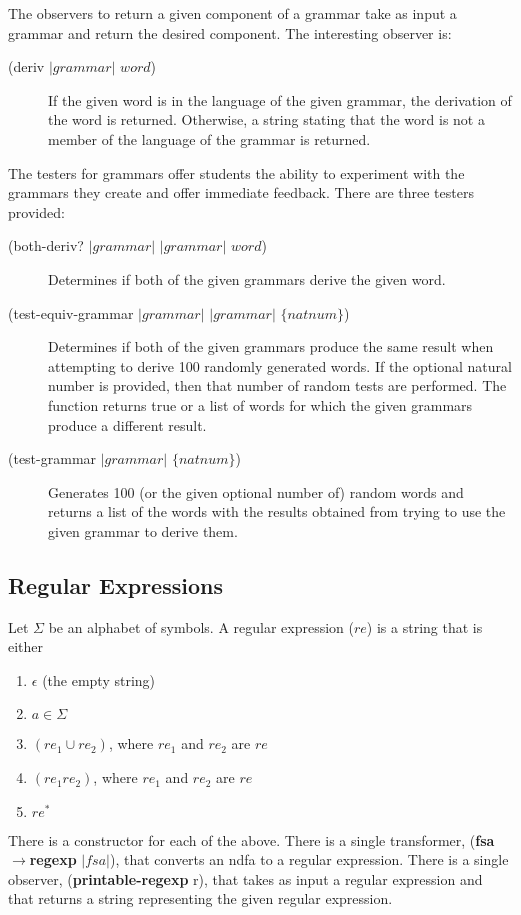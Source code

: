\documentclass{eptcs}
\begin{document}
The observers to return a given component of a grammar take as input a grammar and return the desired component. The interesting observer is:
\begin{description}
  \item [(deriv $|grammar|$ $word$)] If the given word is in the language of the given grammar, the derivation of the word is returned. Otherwise, a string stating that the word is not a member of the language of the grammar is returned.
\end{description}

The testers for grammars offer students the ability to experiment with the grammars they create and offer immediate feedback. There are three testers provided:
\begin{description}
  \item [(both-deriv? $|grammar|$ $|grammar|$ $word$)] Determines if both of the given grammars derive the given word.

  \item [(test-equiv-grammar $|grammar|$ $|grammar|$ $\{natnum\}$)] Determines if both of the given grammars produce the same result when attempting to derive 100 randomly generated words. If the optional natural number is provided, then that number of random tests are performed. The function returns true or a list of words for which the given grammars produce a different result.

  \item [(test-grammar $|grammar|$ $\{natnum\}$)] Generates 100 (or the given optional number of) random words and returns a list of the words with the results obtained from trying to use the given grammar to derive them.
\end{description}

\subsection{Regular Expressions}
Let $\Sigma$ be an alphabet of symbols. A regular expression ($re$) is a string  that is either
\begin{enumerate}
  \item $\epsilon$ (the empty string)
  \item $a \in \Sigma$
  \item $(re_1 \cup re_2)$, where $re_1$ and $re_2$ are $re$
  \item $(re_1re_2)$, where $re_1$ and $re_2$ are $re$
  \item $re^*$
\end{enumerate}
There is a constructor for each of the above. There is a single transformer, (\textbf{fsa$\rightarrow$regexp} $|fsa|$), that converts an \textsf{ndfa} to a regular expression. There is a single observer, (\textbf{printable-regexp} r), that takes as input a regular expression and that returns a string representing the given regular expression.
\end{document}

